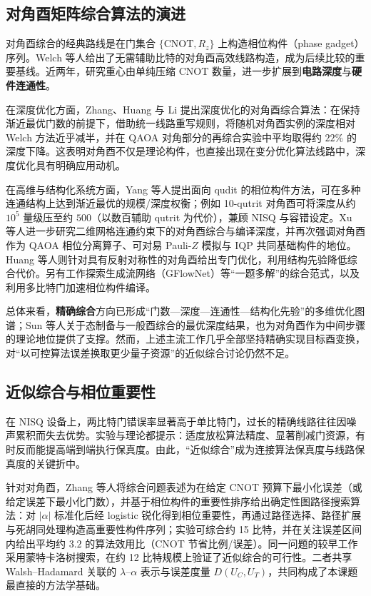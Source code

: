 \documentclass{HDU-Bachelor-Thesis}
\begin{document}
\subsection{对角酉矩阵综合算法的演进}

对角酉综合的经典路线是在门集合 $\{\mathrm{CNOT},R_z\}$ 上构造相位构件（phase gadget）序列。Welch 等人给出了无需辅助比特的对角酉高效线路构造，成为后续比较的重要基线\cite{welch2014diagonal}。近两年，研究重心由单纯压缩 CNOT 数量，进一步扩展到\textbf{电路深度}与\textbf{硬件连通性}。

在深度优化方面，Zhang、Huang 与 Li 提出深度优化的对角酉综合算法：在保持渐近最优门数的前提下，借助统一线路重写规则，将随机对角酉实例的深度相对 Welch 方法近乎减半，并在 QAOA 对角部分的再综合实验中平均取得约 $22\%$ 的深度下降\cite{depth-opt-diagonal2024}。这表明对角酉不仅是理论构件，也直接出现在变分优化算法线路中，深度优化具有明确应用动机。

在高维与结构化系统方面，Yang 等人提出面向 qudit 的相位构件方法，可在多种连通结构上达到渐近最优的规模/深度权衡；例如 10-qutrit 对角酉可将深度从约 $10^5$ 量级压至约 $500$（以数百辅助 qutrit 为代价），兼顾 NISQ 与容错设定\cite{qudit-phase-gadget2025}。Xu 等人进一步研究二维网格连通约束下的对角酉综合与编译深度，并再次强调对角酉作为 QAOA 相位分离算子、可对易 Pauli-$Z$ 模拟与 IQP 共同基础构件的地位\cite{grid-diagonal2026}。Huang 等人则针对具有反射对称性的对角酉给出专门优化，利用结构先验降低综合代价\cite{reflection-symmetry2023}。另有工作探索生成流网络（GFlowNet）等“一题多解”的综合范式\cite{qflownet2026}，以及利用多比特门加速相位构件编译\cite{phase-gadget-multiqubit2025}。

总体来看，\textbf{精确综合}方向已形成“门数—深度—连通性—结构化先验”的多维优化图谱；Sun 等人关于态制备与一般酉综合的最优深度结果，也为对角酉作为中间步骤的理论地位提供了支撑\cite{sun2023optimal}。然而，上述主流工作几乎全部坚持精确实现目标酉变换，对“以可控算法误差换取更少量子资源”的近似综合讨论仍然不足。

\subsection{近似综合与相位重要性}

在 NISQ 设备上，两比特门错误率显著高于单比特门，过长的精确线路往往因噪声累积而失去优势。实验与理论都提示：适度放松算法精度、显著削减门资源，有时反而能提高端到端执行保真度。由此，“近似综合”成为连接算法保真度与线路保真度的关键折中。

针对对角酉，Zhang 等人将综合问题表述为在给定 CNOT 预算下最小化误差（或给定误差下最小化门数），并基于相位构件的重要性排序给出确定性图路径搜索算法：对 $|\alpha|$ 标准化后经 logistic 锐化得到相位重要性，再通过路径选择、路径扩展与死胡同处理构造高重要性构件序列；实验可综合约 15 比特，并在关注误差区间内给出平均约 $3.2$ 的算法效用比（CNOT 节省比例/误差）\cite{zhang2024approximate}。同一问题的较早工作采用蒙特卡洛树搜索，在约 12 比特规模上验证了近似综合的可行性\cite{nisq-mcts-thesis}。二者共享 Walsh--Hadamard 关联的 $\lambda$--$\alpha$ 表示与误差度量 $D(U_C,U_T)$，共同构成了本课题最直接的方法学基础。
\end{document}
